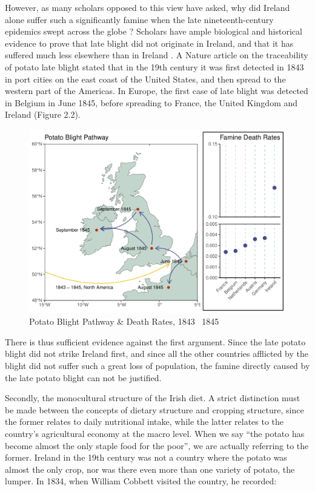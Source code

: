 However, as many scholars opposed to this view have asked, why did Ireland alone suffer such a significantly famine when the late nineteenth-century epidemics swept across the globe \citep{oleksy46irish, mokyr2013ireland, solar2015ireland, kelly2015ireland, gray2006famine}? Scholars have ample biological and historical evidence to prove that late blight did not originate in Ireland, and that it has suffered much less elsewhere than in Ireland \citep{zadoks2008potato}. A Nature article \citep{bourke1964emergence} on the traceability of potato late blight stated that in the 19th century it was first detected in 1843 in port cities on the east coast of the United States, and then spread to the western part of the Americas. In Europe, the first case of late blight was detected in Belgium in June 1845, before spreading to France, the United Kingdom and Ireland (Figure 2.2).

\begin{figure}[htbp]
    \centering
    \caption{Potato Blight Pathway \& Death Rates, 1843 \textendash\ 1845}
    \includegraphics[width=.95\textwidth]{../03_outputs/blight_path_death.pdf}
\end{figure}

There is thus sufficient evidence against the first argument. Since the late potato blight did not strike Ireland first, and since all the other countries afflicted by the blight did not suffer such a great loss of population, the famine directly caused by the late potato blight can not be justified.

Secondly, the monocultural structure of the Irish diet. A strict distinction must be made between the concepts of dietary structure and cropping structure, since the former relates to daily nutritional intake, while the latter relates to the country's agricultural economy at the macro level. When we say “the potato has become almost the only staple food for the poor”, we are actually referring to the former. Ireland in the 19th century was not a country where the potato was almost the only crop, nor was there even more than one variety of potato, the lumper. In 1834, when William Cobbett visited the country, he recorded: 

